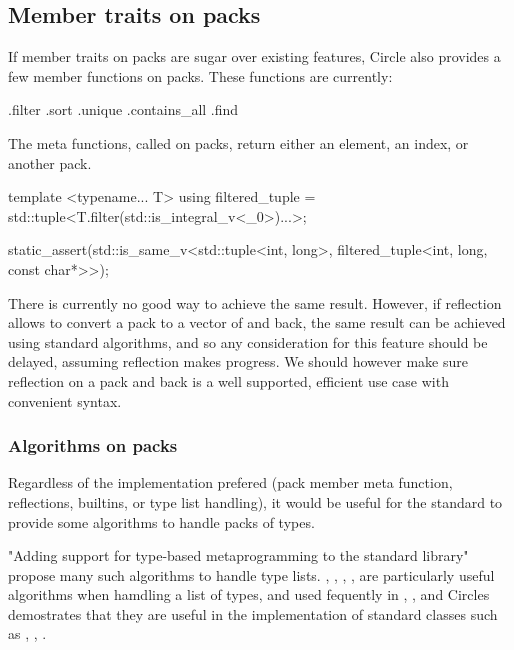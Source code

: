 \documentclass{wg21}
\begin{document}
\subsection{Member traits on packs}

If member traits on packs are sugar over existing features, Circle also provides a few member functions on packs.
These functions are currently:
\begin{codeblock}
.filter
.sort
.unique
.contains_all
.find
\end{codeblock}

The meta functions, called on packs, return either an element, an index, or another pack.

\begin{colorblock}
template <typename... T>
using filtered_tuple = std::tuple<T.filter(std::is_integral_v<_0>)...>;

static_assert(std::is_same_v<std::tuple<int, long>,
                             filtered_tuple<int, long, const char*>>);
\end{colorblock}

There is currently no good way to achieve the same result.
However, if reflection allows to convert a pack to a vector of  and back, the same result can be achieved using standard algorithms, and so any consideration for this feature should be delayed, assuming reflection makes progress.
We should however make sure reflection on a pack and back is a well supported, efficient use case with convenient syntax.

\subsubsection{Algorithms on packs}
\label{sec:algorithms}


Regardless of the implementation prefered (pack member meta function, reflections, builtins, or type list handling), it would be useful for the standard to provide some algorithms to handle packs of types.

 "Adding support for type-based metaprogramming to the standard library" propose many such algorithms to handle type lists.
, , , ,  are particularly useful algorithms when hamdling a list of types, and used fequently in
, , and Circles demostrates that they are useful in the implementation of standard classes such as , , .
\end{document}
